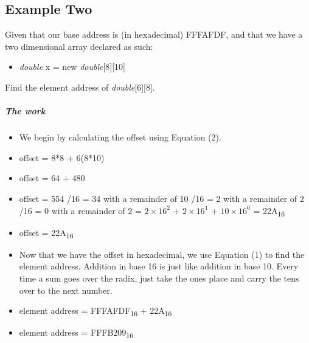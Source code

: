 \documentclass[12pt]{article}
\begin{document}
\subsection{Example Two}
Given that our base address is (in hexadecimal) FFFAFDF, and that we have a two dimensional array declared as such:
\begin{itemize}[leftmargin=1.5em]
\item[] \textit{double} x = new \textit{double}[8][10]
\end{itemize}
Find the element address of \textit{double}[6][8].
\subparagraph{The work}
\begin{itemize}[leftmargin=1.5em]
\item[] We begin by calculating the offset using Equation (2).
\item[] offset = 8*8 + 6(8*10)
\item[] offset = 64 + 480
\item[] offset = 554
/16 = 34 with a remainder of 10
/16 = 2 with a remainder of 2
/16 = 0 with a remainder of 2
 = $2\times16^2$ + $2\times16^1$ + $10\times16^0$
 = 22A\textsubscript{16}
\item[] offset = 22A\textsubscript{16}
\item[] Now that we have the offset in hexadecimal, we use Equation (1) to find the element address. Addition in base 16 is just like addition in base 10. Every time a sum goes over the radix, just take the ones place and carry the tens over to the next number.
\item[] element address = FFFAFDF\textsubscript{16} + 22A\textsubscript{16}
\item[] element address = FFFB209\textsubscript{16}
\end{itemize}
\end{document}
